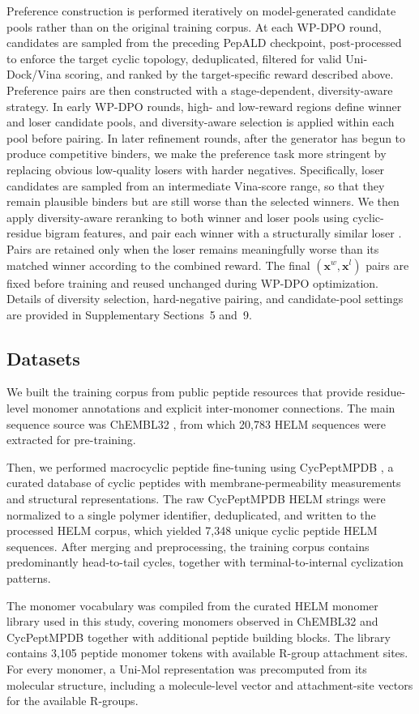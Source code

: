 \begin{methods}
Preference construction is performed iteratively on model-generated candidate pools rather than on the original training corpus.
At each WP-DPO round, candidates are sampled from the preceding PepALD checkpoint, post-processed to enforce the target cyclic topology, deduplicated, filtered for valid Uni-Dock/Vina scoring, and ranked by the target-specific reward described above.
Preference pairs are then constructed with a stage-dependent, diversity-aware strategy.
In early WP-DPO rounds, high- and low-reward regions define winner and loser candidate pools, and diversity-aware selection is applied within each pool before pairing.
In later refinement rounds, after the generator has begun to produce competitive binders, we make the preference task more stringent by replacing obvious low-quality losers with harder negatives.
Specifically, loser candidates are sampled from an intermediate Vina-score range, so that they remain plausible binders but are still worse than the selected winners.
We then apply diversity-aware reranking to both winner and loser pools using cyclic-residue bigram features, and pair each winner with a structurally similar loser \citep{ref_mmr,ref_drugblip}.
Pairs are retained only when the loser remains meaningfully worse than its matched winner according to the combined reward.
The final $(\mathbf{x}^{w},\mathbf{x}^{l})$ pairs are fixed before training and reused unchanged during WP-DPO optimization.
Details of diversity selection, hard-negative pairing, and candidate-pool settings are provided in Supplementary Sections~5 and~9.

\subsection{Datasets}\label{subsec:datasets}

We built the training corpus from public peptide resources that provide residue-level monomer annotations and explicit inter-monomer connections.
The main sequence source was ChEMBL32 \citep{ref_chembl}, from which 20,783 HELM sequences were extracted for pre-training.

Then, we performed macrocyclic peptide fine-tuning using \linebreak[4]CycPeptMPDB \citep{ref_cycpeptmpdb}, a curated database of cyclic peptides with membrane-permeability measurements and structural representations.
The raw CycPeptMPDB HELM strings were normalized to a single polymer identifier, deduplicated, and written to the processed HELM corpus, which yielded 7,348 unique cyclic peptide HELM sequences.
After merging and preprocessing, the training corpus contains predominantly head-to-tail cycles, together with terminal-to-internal cyclization patterns.

The monomer vocabulary was compiled from the curated HELM monomer library used in this study, covering monomers observed in ChEMBL32 and CycPeptMPDB together with additional peptide building blocks.
The library contains 3,105 peptide monomer tokens with available R-group attachment sites.
For every monomer, a Uni-Mol representation was precomputed from its molecular structure, including a molecule-level vector and attachment-site vectors for the available R-groups.

\end{methods}

